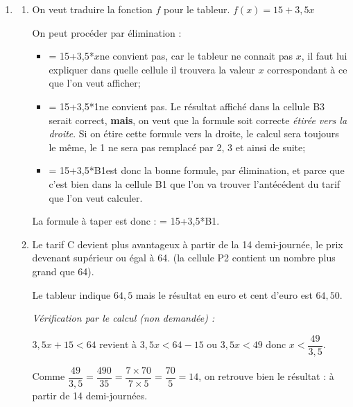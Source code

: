 \begin{enumerate}
	\item \begin{enumerate}
		\item On veut traduire la fonction $f$ pour le tableur. \quad $f(x) = 15 + 3,5x$

		On peut procéder par élimination :
		\begin{itemize}
			\item \textsf{= 15+3,5*$x$}\quad ne convient pas, car le tableur ne connait pas $x$, il faut lui expliquer dans quelle cellule il trouvera la valeur $x$ correspondant à ce que l'on veut afficher;
			\item \textsf{= 15+3,5*1}\quad ne convient pas. Le résultat affiché dans la cellule \textsf{B3} serait correct, \textbf{mais}, on veut que la formule soit correcte \emph{étirée vers la droite}. Si on étire cette formule vers la droite, le calcul sera toujours le même, le 1 ne sera pas remplacé par 2, 3 et ainsi de suite;
			\item \textsf{= 15+3,5*B1}\quad est donc la bonne formule, par élimination, et parce que c'est bien dans la cellule \textsf{B1} que l'on va trouver l'antécédent du tarif que l'on veut calculer.
		\end{itemize}

		La formule à taper est donc :\quad\textsf{  = 15+3,5*B1.}

		\item Le tarif C devient plus avantageux à partir de la 14 demi-journée, le prix devenant supérieur ou égal à 64. (la cellule \textsf{P2} contient un nombre plus grand que 64).

Le tableur indique $64,5$ mais le résultat en euro et cent d'euro est $64,50$.

		\emph{Vérification par le calcul (non demandée) :}

$3,5x + 15 <  64$ \quad revient à \quad $3,5x<  64-15
	$ ou $3,5x <  49$ \quad donc \quad $x < \dfrac{49}{3,5}$.

Comme \quad $\dfrac{49}{3,5} = \dfrac{490}{35} = \dfrac{7\times 70}{7\times 5} = \dfrac{70}{5} = 14$, \quad on retrouve bien le résultat : à partir de 14 demi-journées.
	\end{enumerate}
\end{enumerate}
